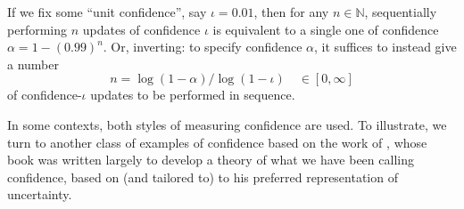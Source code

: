 %
If we fix some ``unit confidence'', say $\iota=0.01$,
then for any $n \in \mathbb N$,
sequentially performing $n$ updates of confidence $\iota$ is 
equivalent to a single one of confidence $\alpha= 1-(0.99)^n$.
Or, inverting:
to specify confidence $\alpha$, it suffices to 
instead give a number
\begin{equation} \label{eq:loglogiota}
 	n = \log (1 - \alpha ) / \log(1-\iota) 
	\quad\in[0,\infty]
\end{equation}
of confidence-$\iota$ updates to be performed in sequence.

In some contexts, both styles of measuring confidence are used. 
To illustrate, 
we turn to another class of examples of confidence
based on the work of 
\citeauthor{shafer1976mathematical},
whose 
\citeyear{shafer1976mathematical} book
was written largely 
to develop a theory of what we have been calling confidence,
based on (and tailored to) to his preferred representation of
uncertainty. 
%


